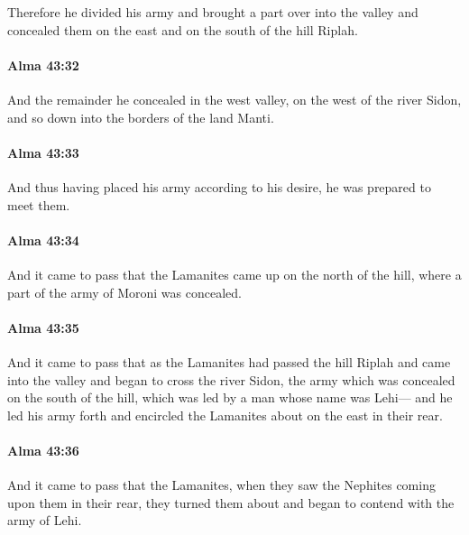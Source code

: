 			Therefore he divided his army and brought a part over into the valley
			and concealed them on the east and on the south of the hill Riplah.

		\paragraph{Alma 43:32} %
			\label{ALMA-43-32}

			And the remainder he concealed in the west valley,
			on the west of the river Sidon,
			and so down into the borders of the land Manti.

		\paragraph{Alma 43:33} %
			\label{ALMA-43-33}

			And thus having placed his army according to his desire,
			he was prepared to meet them.

		\paragraph{Alma 43:34} %
			\label{ALMA-43-34}

			And it came to pass that the Lamanites came up on the north of the hill,
			where a part of the army of Moroni was concealed.

		\paragraph{Alma 43:35} %
			\label{ALMA-43-35}

			And it came to pass that as the Lamanites had passed the hill Riplah
			and came into the valley and began to cross the river Sidon,
			the army which was concealed on the south of the hill,
			which was led by a man whose name was Lehi---
			and he led his army forth
			and encircled the Lamanites about on the east in their rear.

		\paragraph{Alma 43:36} %
			\label{ALMA-43-36}

			And it came to pass that the Lamanites,
			when they saw the Nephites coming upon them in their rear,
			they turned them about and began to contend with the army of Lehi.

